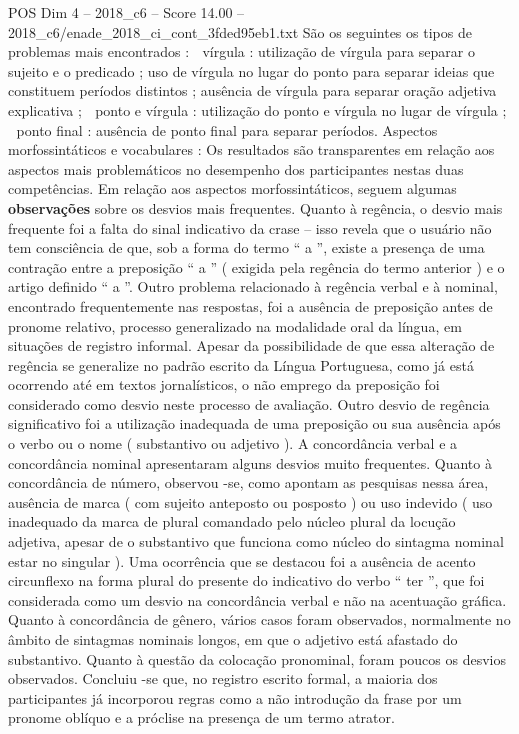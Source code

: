\begin{textsample}{POS Dim 4 – 2018\_c6 – Score 14.00 – 2018\_c6/enade\_2018\_ci\_cont\_3fded95eb1.txt}
São os seguintes os tipos de problemas mais encontrados :  vírgula : utilização de vírgula para separar o sujeito e o predicado ; uso de vírgula no lugar do ponto para separar ideias que constituem períodos distintos ; ausência de vírgula para separar oração adjetiva explicativa ;  ponto e vírgula : utilização do ponto e vírgula no lugar de vírgula ;  ponto final : ausência de ponto final para separar períodos.
Aspectos morfossintáticos e vocabulares : Os resultados são transparentes em relação aos aspectos mais problemáticos no desempenho dos participantes nestas duas competências.
Em relação aos aspectos morfossintáticos, seguem algumas \textbf{observações} sobre os desvios mais frequentes.
Quanto à regência, o desvio mais frequente foi a falta do sinal indicativo da crase – isso revela que o usuário não tem consciência de que, sob a forma do termo “ a ”, existe a presença de uma contração entre a preposição “ a ” ( exigida pela regência do termo anterior ) e o artigo definido “ a ”.
Outro problema relacionado à regência verbal e à nominal, encontrado frequentemente nas respostas, foi a ausência de preposição antes de pronome relativo, processo generalizado na modalidade oral da língua, em situações de registro informal.
Apesar da possibilidade de que essa alteração de regência se generalize no padrão escrito da Língua Portuguesa, como já está ocorrendo até em textos jornalísticos, o não emprego da preposição foi considerado como desvio neste processo de avaliação.
Outro desvio de regência significativo foi a utilização inadequada de uma preposição ou sua ausência após o verbo ou o nome ( substantivo ou adjetivo ).
A concordância verbal e a concordância nominal apresentaram alguns desvios muito frequentes.
Quanto à concordância de número, observou -se, como apontam as pesquisas nessa área, ausência de marca ( com sujeito anteposto ou posposto ) ou uso indevido ( uso inadequado da marca de plural comandado pelo núcleo plural da locução adjetiva, apesar de o substantivo que funciona como núcleo do sintagma nominal estar no singular ).
Uma ocorrência que se destacou foi a ausência de acento circunflexo na forma plural do presente do indicativo do verbo “ ter ”, que foi considerada como um desvio na concordância verbal e não na acentuação gráfica.
Quanto à concordância de gênero, vários casos foram observados, normalmente no âmbito de sintagmas nominais longos, em que o adjetivo está afastado do substantivo.
Quanto à questão da colocação pronominal, foram poucos os desvios observados.
Concluiu -se que, no registro escrito formal, a maioria dos participantes já incorporou regras como a não introdução da frase por um pronome oblíquo e a próclise na presença de um termo atrator.

\end{textsample}
